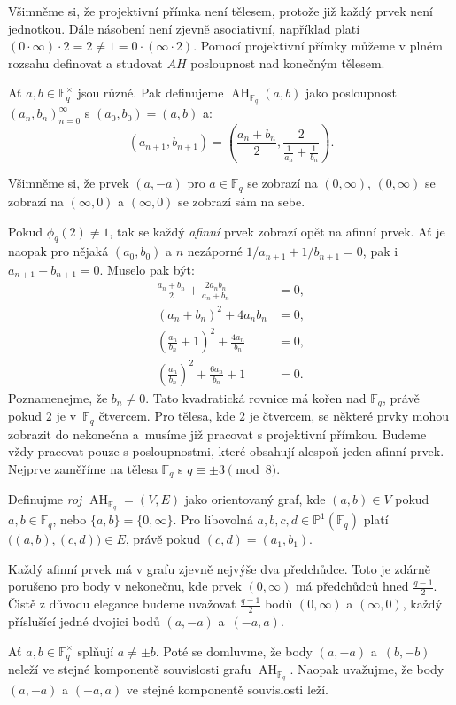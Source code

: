 \documentclass[12pt]{report}
\DeclareMathOperator{\AH}{AH}
\begin{document}
Všimněme si, že projektivní přímka není tělesem, protože již každý prvek není jednotkou. Dále násobení není zjevně asociativní, například platí $(0 \cdot \infty) \cdot 2 = 2 \neq   1 = 0 \cdot (\infty \cdot 2)$. Pomocí projektivní přímky můžeme v plném rozsahu definovat a studovat $AH$ posloupnost nad konečným tělesem.

\begin{definice}
Ať $a,b \in \mathbb{F}_q ^{\times}$ jsou různé. Pak definujeme $\AH_{\mathbb{F}_q}(a,b)$ jako posloupnost $(a_n,b_n)_{n=0}^{\infty}$ s $(a_0,b_0) = (a,b)$ a:
\begin{equation*}
\left(a_{n+1},b_{n+1} \right) = \left(\frac{a_n+b_n}{2}, \frac{2}{\frac{1}{a_n} + \frac{1}{b_n}} \right).
\end{equation*}
\end{definice}

Všimněme si, že prvek $(a,-a)$ pro $a \in \mathbb{F}_q$ se zobrazí na $(0,\infty)$, $(0,\infty)$ se zobrazí na $(\infty,0)$ a $(\infty,0)$ se zobrazí sám na sebe. 

Pokud $\phi_q(2) \neq 1$, tak se každý \textit{afinní} prvek zobrazí opět na afinní prvek. Ať je naopak pro nějaká $(a_0,b_0)$ a $n$ nezáporné $1/a_{n+1} + 1/b_{n+1} = 0$, pak i $a_{n+1} + b_{n+1} = 0$. Muselo pak být:
\begin{align*}
\frac{a_n+b_n}{2} + \frac{2 a_n b_n}{a_n + b_n} &= 0,\\
(a_n+b_n)^2 + 4 a_n b_n &= 0,\\
\left(\frac{a_n}{b_n} + 1 \right)^2 + \frac{4a_n}{b_n} &= 0,\\
\left(\frac{a_n}{b_n}\right)^2 + \frac{6a_n}{b_n} + 1 &= 0.
\end{align*}
Poznamenejme, že $b_n \neq 0$. Tato kvadratická rovnice má kořen nad $\mathbb{F}_q$, právě pokud $2$ je v~$\mathbb{F}_q$ čtvercem. Pro tělesa, kde $2$ je čtvercem, se některé prvky mohou zobrazit do nekonečna a~musíme již pracovat s projektivní přímkou. Budeme vždy pracovat pouze s posloupnostmi, které obsahují alespoň jeden afinní prvek. Nejprve zaměříme na tělesa $\mathbb{F}_q$ s $q \equiv \pm 3 \pmod{8}$.

\begin{definice}
Definujme \textit{roj} $\AH_{\mathbb{F}_q} = (V,E)$ jako orientovaný graf, kde $(a,b) \in V$ pokud $a,b \in \mathbb{F}_q$, nebo $\lbrace a,b \rbrace = \lbrace 0,\infty \rbrace$. Pro libovolná $a,b,c,d \in \mathbb{P}^1 (\mathbb{F}_q)$ platí $\Big((a,b), (c,d) \Big) \in E$, právě pokud $(c,d) = (a_1,b_1)$. 
\end{definice}
Každý afinní prvek má v grafu zjevně nejvýše dva předchůdce. Toto je zdárně porušeno pro body v nekonečnu, kde prvek $(0,\infty)$ má předchůdců hned $\frac{q-1}{2}$. Čistě z důvodu elegance budeme uvažovat $\frac{q-1}{2}$ bodů $(0,\infty)$ a $(\infty,0)$, každý příslušící jedné dvojici bodů $(a,-a)$ a~$(-a,a)$. 
\begin{umluva}
Ať $a,b \in \mathbb{F}_q ^{\times}$ splňují $a \neq \pm b$. Poté se domluvme, že body $(a,-a)$ a~$(b,-b)$ neleží ve stejné komponentě souvislosti grafu $\AH_{\mathbb{F}_q}$. Naopak uvažujme, že body $(a,-a)$ a $(-a,a)$ ve stejné komponentě souvislosti leží.
\end{umluva}
\end{document}
